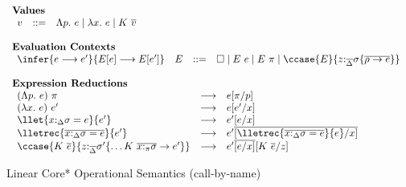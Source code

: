
\begin{figure}[h]
\begin{framed}
\small
\[
\begin{array}{l}
%
\textbf{Values} \\
\begin{array}{lcl}
    v & ::= & \Lambda p.~e \mid \lambda x.~e \mid K~\overline{v} \\
\end{array}\\\\
%
\textbf{Evaluation Contexts}\\
\begin{array}{llcl}
\infer{e \longrightarrow e'}{E[e] \longrightarrow E[e']} & E & ::= & \square \mid E~e \mid E~\pi \mid \ccase{E}{z{:}_{\overline{\Delta}}\sigma \{\overline{\rho \to e}\}} \\
\end{array}\\\\
%
\textbf{Expression Reductions}\\
\begin{array}{lcl}
(\Lambda p.~e)~\pi & \longrightarrow & e[\pi/p]\\
(\lambda x.~e)~e' & \longrightarrow & e[e'/x]\\
\llet{x{:}_\Delta\sigma = e}{e'} & \longrightarrow & e'[e/x]\\
\lletrec{\overline{x{:}_\Delta\sigma = e}}{e'} & \longrightarrow & e'\overline{[\lletrec{\overline{x{:}_\Delta\sigma = e}}{e}/x]}\\
    \ccase{K~\overline{e}}{z{:}_{\overline{\Delta}}\sigma' \{\dots K~\overline{x{:}_\pi\sigma} \to e'\}} &
    \longrightarrow & e'\overline{[e/x]}[K~\overline{e}/z]\\
\end{array}
\end{array}
\]
\end{framed}
\caption{Linear Core* Operational Semantics \small(call-by-name)}
\label{linear-core-operational-semantics}
\end{figure}

